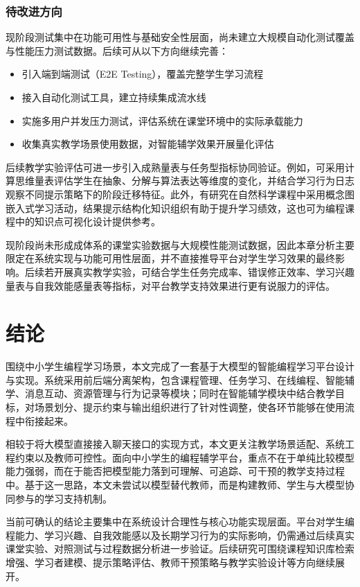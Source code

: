 \subsection{待改进方向}
现阶段测试集中在功能可用性与基础安全性层面，尚未建立大规模自动化测试覆盖与性能压力测试数据。后续可从以下方向继续完善：
\begin{itemize}
  \item 引入端到端测试（E2E Testing），覆盖完整学生学习流程
  \item 接入自动化测试工具，建立持续集成流水线
  \item 实施多用户并发压力测试，评估系统在课堂环境中的实际承载能力
  \item 收集真实教学场景使用数据，对智能辅学效果开展量化评估
\end{itemize}

后续教学实验评估可进一步引入成熟量表与任务型指标协同验证。例如，可采用计算思维量表评估学生在抽象、分解与算法表达等维度的变化\cite{tsai2021cts}，并结合学习行为日志观察不同提示策略下的阶段迁移特征\cite{sun2023transitioning}。此外，有研究在自然科学课程中采用概念图嵌入式学习活动，结果提示结构化知识组织有助于提升学习绩效，这也可为编程课程中的知识点可视化设计提供参考\cite{hwang2013conceptmap}。

现阶段尚未形成成体系的课堂实验数据与大规模性能测试数据，因此本章分析主要限定在系统实现与功能可用性层面，并不直接推导平台对学生学习效果的最终影响。后续若开展真实教学实验，可结合学生任务完成率、错误修正效率、学习兴趣量表与自我效能感量表等指标，对平台教学支持效果进行更有说服力的评估\cite{tang2025middleschool}。


\chapter{结论}

围绕中小学生编程学习场景，本文完成了一套基于大模型的智能编程学习平台设计与实现。系统采用前后端分离架构，包含课程管理、任务学习、在线编程、智能辅学、消息互动、资源管理与行为记录等模块；同时在智能辅学模块中结合教学目标，对场景划分、提示约束与输出组织进行了针对性调整，使各环节能够在使用流程中衔接起来。

相较于将大模型直接接入聊天接口的实现方式，本文更关注教学场景适配、系统工程约束以及教师可控性。面向中小学生的编程辅学平台，重点不在于单纯比较模型能力强弱，而在于能否把模型能力落到可理解、可追踪、可干预的教学支持过程中。基于这一思路，本文未尝试以模型替代教师，而是构建教师、学生与大模型协同参与的学习支持机制。

当前可确认的结论主要集中在系统设计合理性与核心功能实现层面。平台对学生编程能力、学习兴趣、自我效能感以及长期学习行为的实际影响，仍需通过后续真实课堂实验、对照测试与过程数据分析进一步验证。后续研究可围绕课程知识库检索增强、学习者建模、提示策略评估、教师干预策略与教学实验设计等方向继续展开。
